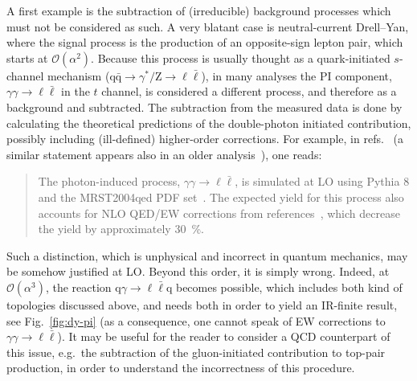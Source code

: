A first example is the subtraction of (irreducible) background processes which must not be considered as such. A very blatant case
is neutral-current Drell--Yan, where the signal process is the production of an opposite-sign lepton pair, which starts
at $\mathcal O(\alpha^2)$. Because this process is usually thought
as a quark-initiated $s$-channel mechanism ($\mathrm{q} \bar{\mathrm{q}} \to \gamma^*/\mathrm{Z} \to \ell \bar{\ell}$), in many analyses the PI component,
$\gamma \gamma \to \ell \bar{\ell}$ in the $t$ channel, is considered a different process, and therefore as a background and subtracted.
The subtraction from the measured data is done by calculating the theoretical predictions of the double-photon initiated contribution, possibly including (ill-defined) higher-order
corrections. For example, in refs.~\cite{Aaboud:2017ffb,Aad:2016zzw} (a similar statement appears also in an older analysis~\cite{Aad:2013iua}), one reads:
\begin{quote}
The photon-induced process, $\gamma\gamma \to \ell \bar{\ell}$, is simulated at LO using Pythia 8
and the MRST2004qed PDF set~\cite{Martin:2004dh}. The expected yield for this process also accounts for 
NLO QED/EW corrections from references~\cite{Bardin:2012jk,Bondarenko:2013nu}, which decrease the yield by approximately \SI{30}{\percent}.
\end{quote}
Such a distinction, which is unphysical and incorrect in quantum mechanics, may be somehow justified at LO\@. Beyond this order, it is simply wrong.
Indeed, at $\mathcal O(\alpha^3)$, the reaction $\mathrm{q} \gamma \to \ell \bar{\ell} \mathrm{q}$ becomes possible, which
includes both kind of topologies discussed above, and needs both in order to yield an IR-finite result, see Fig.~\ref{fig:dy-pi} (as a consequence, one cannot speak of EW corrections to $\gamma \gamma \to \ell \bar{\ell}$). It may be useful for the reader to consider a QCD counterpart of this issue, 
e.g.\ the subtraction of the gluon-initiated contribution to top-pair production, in order to understand the incorrectness of this procedure.

